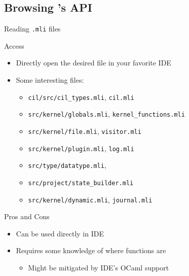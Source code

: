 \subsection{Browsing \protect\framac's API}

\begin{frame}{Reading \texttt{.mli} files}
\begin{block}{Access}
\begin{itemize}
\item Directly open the desired file in your favorite IDE
\item Some interesting files:
\begin{itemize}
\item \texttt{cil/src/cil\_types.mli}, \texttt{cil.mli}
\item \texttt{src/kernel/globals.mli}, \texttt{kernel\_functions.mli}
\item \texttt{src/kernel/file.mli}, \texttt{visitor.mli}
\item \texttt{src/kernel/plugin.mli}, \texttt{log.mli}
\item \texttt{src/type/datatype.mli}, 
\item \texttt{src/project/state\_builder.mli}
\item \texttt{src/kernel/dynamic.mli}, \texttt{journal.mli}
\end{itemize}
\end{itemize}
\end{block}
\begin{block}{Pros and Cons}
\begin{itemize}
\item[\pros] Can be used directly in IDE
\item[\cons] Requires some knowledge of where functions are
\begin{itemize}
\item Might be mitigated by IDE's OCaml support
\end{itemize}
\end{itemize}
\end{block}
\end{frame}

